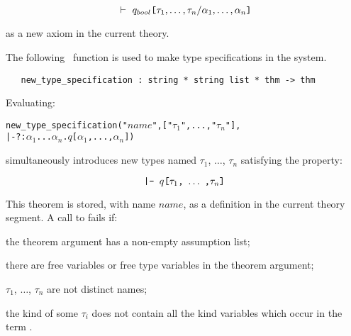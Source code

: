 \[\turn q_{bool}\ml{[}{\tau_1},\ldots,{\tau_n}/{\alpha_1},\ldots,{\alpha_n}\ml{]} \]

\noindent as a new axiom in the current theory.

The following \ML\ function is used to make type specifications in
the \HOL{} system.

\begin{holboxed}
\begin{verbatim}
   new_type_specification : string * string list * thm -> thm
\end{verbatim}
\end{holboxed}
%
Evaluating:
{
\newcommand{\tauone}{\ensuremath{\tau_1}}
\newcommand{\taun}{\ensuremath{\tau_n}}
\newcommand{\alphaone}{\ensuremath{\alpha_1}}
\newcommand{\alphan}{\ensuremath{\alpha_n}}
\begin{alltt}
   new_type_specification("\(\mathit{name}\)", ["\tauone", ..., "\taun"],
                          |- ?:\alphaone ... \alphan. \(q\)[\alphaone, ..., \alphan])
\end{alltt}
}
simultaneously introduces new types named $\tau_1$, $\dots$,
$\tau_n$ satisfying the property:

\[ \ml{|- }q\ml{[}\tau_1\ml{,}\ \ldots\ \ml{,}\tau_n\ml{]} \]

\noindent This theorem is stored,
with name $name$, as a definition in the current theory segment. A call to
 fails if:

\begin{myenumerate}
\item the theorem argument has a non-empty assumption list;
\item there are free variables or free type variables in the theorem argument;
\item $\tau_1$, $\dots$, $\tau_n$ are not distinct names;
\item the kind of some $\tau_i$ does not contain all the kind
variables which occur in the term
.
\end{myenumerate}
%



